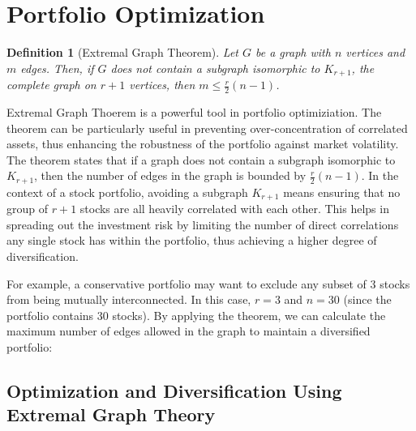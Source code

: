 \documentclass{article}
\newtheorem{definition}[theorem]{Definition}
\begin{document}










\section{Portfolio Optimization}

\begin{definition}[Extremal Graph Theorem] Let $G$ be a graph with $n$ vertices and $m$ edges. Then, if $G$ does not contain a subgraph isomorphic to $K_{r+1}$, the complete graph on $r+1$ vertices, then $m \leq \frac{r}{2}(n-1)$.
\end{definition}

Extremal Graph Thoerem is a powerful tool in portfolio optimiziation. The theorem can be particularly useful in preventing over-concentration of correlated assets, thus enhancing the robustness of the portfolio against market volatility. The theorem states that if a graph does not contain a subgraph isomorphic to $K_{r+1}$, then the number of edges in the graph is bounded by $\frac{r}{2}(n-1)$. In the context of a stock portfolio, avoiding a subgraph $K_{r+1}$ means ensuring that no group of $r+1$ stocks are all heavily correlated with each other. This helps in spreading out the investment risk by limiting the number of direct correlations any single stock has within the portfolio, thus achieving a higher degree of diversification. 

For example, a conservative portfolio may want to exclude any subset of 3 stocks from being mutually interconnected. In this case, $r = 3$ and $n = 30$ (since the portfolio contains 30 stocks). By applying the theorem, we can calculate the maximum number of edges allowed in the graph to maintain a diversified portfolio:

\subsection{Optimization and Diversification Using Extremal Graph Theory}
\end{document}
